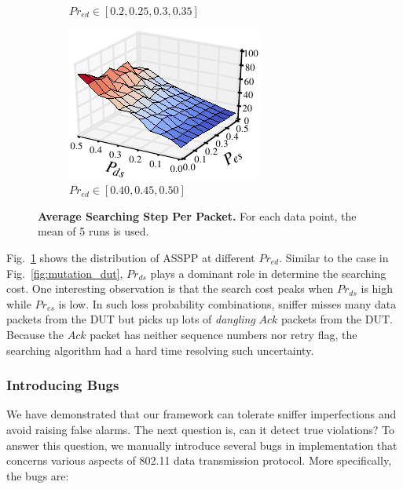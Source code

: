 \begin{figure}[t!]
\begin{subfigure}{0.33\textwidth}
    \caption{$Pr_{ed} \in [0.2, 0.25, 0.3, 0.35]$}
  \end{subfigure}\hspace*{0.01\textwidth}
  \begin{subfigure}{0.33\textwidth}
    \centering
    \includegraphics[width=\textwidth]{./figures/scripts/StepCount3DFigure_0_50.pdf}
    \caption{$Pr_{ed} \in [0.40, 0.45, 0.50]$}
  \end{subfigure}
  \caption{\textbf{Average Searching Step Per Packet.} For each data point, the mean of 5 runs
  is used.}
  \label{fig:cost}
\end{figure}


Fig.~\ref{fig:cost} shows the distribution of ASSPP at different $Pr_{ed}$.
Similar to the case in Fig.~\ref{fig:mutation_dut}, $Pr_{ds}$ plays a dominant
role in determine the searching cost. One interesting observation is that the
search cost peaks when $Pr_{ds}$ is high while $Pr_{es}$ is low. In such loss
probability combinations, sniffer misses many data packets from the DUT but
picks up lots of \textit{dangling} $Ack$ packets from the DUT. Because the $Ack$
packet has neither sequence numbers nor retry flag, the searching algorithm had
a hard time resolving such uncertainty.

\subsubsection{Introducing Bugs}

We have demonstrated that our framework can tolerate sniffer imperfections and
avoid raising false alarms.  The next question is, can it detect true
violations?  To answer this question, we manually introduce several bugs in
\ns{} implementation that concerns various aspects of 802.11 data transmission
protocol.  More specifically, the bugs are:


